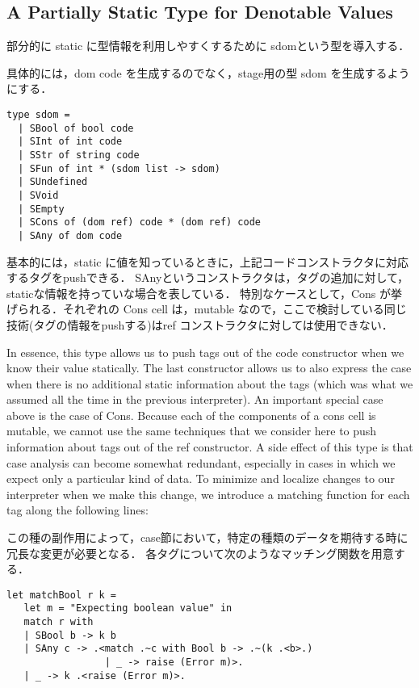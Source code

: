 \documentclass[10pt,a4paper]{jarticle}
\theoremstyle{definition}
\begin{document}
\subsection{A Partially Static Type for Denotable Values}
部分的に static に型情報を利用しやすくするために sdomという型を導入する．

具体的には，dom code を生成するのでなく，stage用の型 sdom を生成するようにする．

{\small
\begin{verbatim}
type sdom =
  | SBool of bool code
  | SInt of int code
  | SStr of string code
  | SFun of int * (sdom list -> sdom)
  | SUndefined
  | SVoid
  | SEmpty
  | SCons of (dom ref) code * (dom ref) code
  | SAny of dom code
\end{verbatim}}

基本的には，static に値を知っているときに，上記コードコンストラクタに対応するタグをpushできる．
SAnyというコンストラクタは，タグの追加に対して，staticな情報を持っていな場合を表している．
特別なケースとして，Cons が挙げられる．それぞれの Cons cell は，mutable なので，ここで検討している同じ技術(タグの情報をpushする)はref コンストラクタに対しては使用できない．


In essence, this type allows us to push tags out of the code constructor when we know their value statically. The last constructor allows us to also express the case when there is no additional static information about the tags (which was what we assumed all the time in the previous interpreter).
An important special case above is the case of Cons. Because each of the components of a cons cell is mutable, we cannot use the same techniques that we consider here to push information about tags out of the ref constructor.
A side effect of this type is that case analysis can become somewhat redundant, especially in cases in which we expect only a particular kind of data. To minimize and localize changes to our interpreter when we make this change, we introduce a matching function for each tag along the following lines:

この種の副作用によって，case節において，特定の種類のデータを期待する時に冗長な変更が必要となる．
各タグについて次のようなマッチング関数を用意する．

{\small
\begin{verbatim}
let matchBool r k =
   let m = "Expecting boolean value" in
   match r with
   | SBool b -> k b
   | SAny c -> .<match .~c with Bool b -> .~(k .<b>.)
                 | _ -> raise (Error m)>.
   | _ -> k .<raise (Error m)>.
\end{verbatim}}
\end{document}
